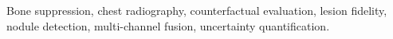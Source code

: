 \documentclass[journal]{IEEEtran}
\begin{document}
\begin{IEEEkeywords}
Bone suppression, chest radiography, counterfactual evaluation, lesion fidelity, nodule detection, multi-channel fusion, uncertainty
quantification.
\end{IEEEkeywords}











\end{document}
